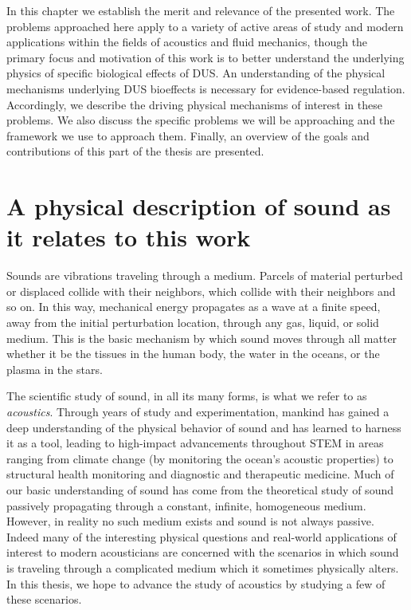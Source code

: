 In this chapter we establish the merit and relevance of the presented
work. The problems approached here apply to a variety of active areas
of study and modern applications within the fields of acoustics and
fluid mechanics, though the primary focus and motivation of this work
is to better understand the underlying physics of specific biological
effects of \ac{DUS}. An understanding of the physical mechanisms
underlying \ac{DUS} bioeffects is necessary for evidence-based
regulation. Accordingly, we describe the driving physical mechanisms
of interest in these problems. We also discuss the specific problems
we will be approaching and the framework we use to approach
them. Finally, an overview of the goals and contributions of this part
of the thesis are presented.

\section{A physical description of sound as it relates to this work}
Sounds are vibrations traveling through a medium. Parcels of material
perturbed or displaced collide with their neighbors, which
collide with their neighbors and so on. In this way, mechanical energy
propagates as a wave at a finite speed, away from the initial
perturbation location, through any gas, liquid, or solid medium. This
is the basic mechanism by which sound moves through all matter whether
it be the tissues in the human body, the water in the oceans, or the
plasma in the stars.

The scientific study of sound, in all its many forms, is what we refer
to as \emph{acoustics}. Through years of study and experimentation,
mankind has gained a deep understanding of the physical behavior of
sound and has learned to harness it as a tool, leading to high-impact
advancements throughout \ac{STEM} in areas ranging from climate change
(by monitoring the ocean's acoustic properties) to structural health
monitoring and diagnostic and therapeutic medicine. Much of our basic
understanding of sound has come from the theoretical study of sound
passively propagating through a constant, infinite, homogeneous
medium. However, in reality no such medium exists and sound is not
always passive. Indeed many of the interesting physical questions and
real-world applications of interest to modern acousticians are
concerned with the scenarios in which sound is traveling through a
complicated medium which it sometimes physically alters. In this
thesis, we hope to advance the study of acoustics by studying a few of
these scenarios.

